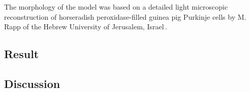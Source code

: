 \documentclass[12pt]{article}
\begin{document}
The morphology of the model was based on a detailed light microscopic reconstruction of horseradish peroxidase-filled guinea pig Purkinje cells by M. Rapp of the Hebrew University of Jerusalem, Israel\,\cite{Rapp-P:1994qf}.

\subsection*{Result}

\subsection*{Discussion}



\end{document}
